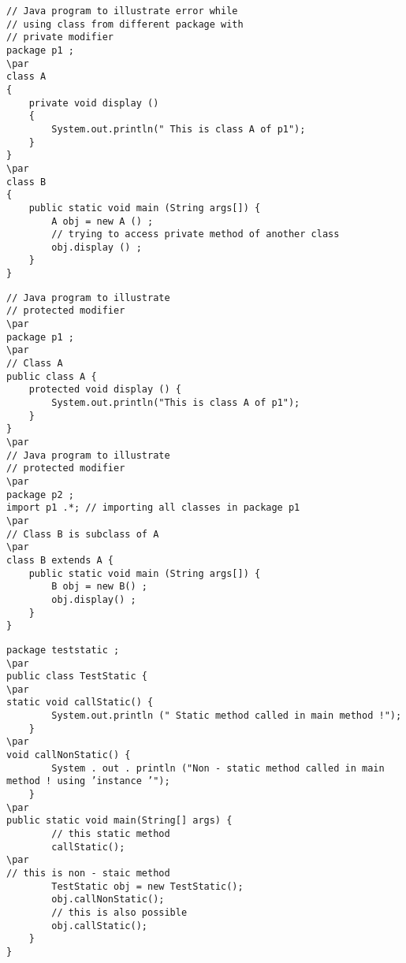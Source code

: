 \documentclass{book}
\def\lthtmlcheckvsize{\ifdim\ht\sizebox<\vsize 
  \ifdim\wd\sizebox<\hsize\expandafter\hfill\fi \expandafter\vfill
  \else\expandafter\vss\fi}%
\begin{document}
{\newpage\clearpage
{}%
\begin{lstlisting}
// Java program to illustrate error while
// using class from different package with
// private modifier
package p1 ;
\par
class A
{
	private void display ()
	{
		System.out.println(" This is class A of p1");
	}
}
\par
class B
{
	public static void main (String args[]) {
		A obj = new A () ;	
		// trying to access private method of another class
		obj.display () ;
	}
}
\end{lstlisting}%
\lthtmlfigureZ
\lthtmlcheckvsize\clearpage}

{\newpage\clearpage
{}%
\begin{lstlisting}
// Java program to illustrate
// protected modifier
\par
package p1 ;
\par
// Class A
public class A {
	protected void display () {
		System.out.println("This is class A of p1");
	}
}
\par
// Java program to illustrate
// protected modifier
\par
package p2 ;
import p1 .*; // importing all classes in package p1
\par
// Class B is subclass of A
\par
class B extends A {
	public static void main (String args[]) {
		B obj = new B() ;
		obj.display() ;
	}
}
\end{lstlisting}%
\lthtmlfigureZ
\lthtmlcheckvsize\clearpage}

{\newpage\clearpage
{}%
\begin{lstlisting}
package teststatic ;
\par
public class TestStatic {
\par
static void callStatic() {
		System.out.println (" Static method called in main method !");
	}
\par
void callNonStatic() {
		System . out . println ("Non - static method called in main method ! using ’instance ’");
	}
\par
public static void main(String[] args) {
		// this static method
		callStatic();
\par
// this is non - staic method
		TestStatic obj = new TestStatic();
		obj.callNonStatic();
		// this is also possible
		obj.callStatic();
	}
}
\end{lstlisting}%
\lthtmlfigureZ
\lthtmlcheckvsize\clearpage}
\end{document}
